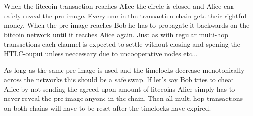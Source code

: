 When the litecoin transaction reaches Alice the circle is closed and Alice can safely reveal the pre-image. Every one in the transaction chain gets their rightful money. When the pre-image reaches Bob he has to propagate it backwards on the bitcoin network until it reaches Alice again. Just as with regular multi-hop transactions each channel is expected to settle without closing and spening the HTLC-ouput unless neccessary due to uncooperative nodes etc... 

As long as the same pre-image is used and the timelocks decrease monotonically across the networks this should be a safe swap. If let's say Bob tries to cheat Alice by not sending the agreed upon amount of litecoins Alice simply has to never reveal the pre-image anyone in the chain. Then all multi-hop transactions on both chains will have to be reset after the timelocks have expired.